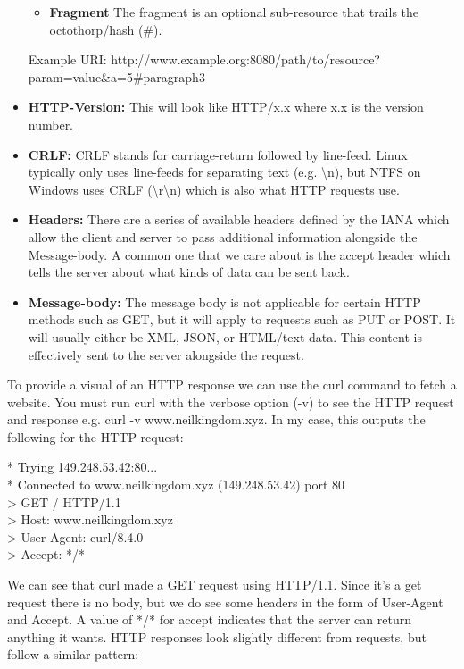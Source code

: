 \documentclass{article}
\begin{document}
\begin{itemize}
{\begin{itemize}
   \item{%
       \textbf{Fragment} The fragment is an optional sub-resource that trails the octothorp/hash (\#).
   }

   \end{itemize}

   Example URI: http://www.example.org:8080/path/to/resource?param=value\&a=5\#paragraph3
}

\item{%
   \textbf{HTTP-Version:} This will look like HTTP/x.x where x.x is the version number.
}

\item{%
   \textbf{CRLF:} CRLF stands for carriage-return followed by line-feed. Linux typically only uses
   line-feeds for separating text (e.g. \textbackslash{}n), but NTFS on Windows uses CRLF
   (\textbackslash{}r\textbackslash{}n) which is also what HTTP requests use.
}

\item{%
   \textbf{Headers:} There are a series of available headers defined by the IANA which allow the
   client and server to pass additional information alongside the Message-body. A common one that we care
   about is the accept header which tells the server about what kinds of data can be sent back.
}

\item{%
   \textbf{Message-body:} The message body is not applicable for certain HTTP methods such as GET,
   but it will apply to requests such as PUT or POST. It will usually either be XML, JSON, or HTML/text data.
   This content is effectively sent to the server alongside the request.
}

\end{itemize}

To provide a visual of an HTTP response we can use the curl command to fetch a website. You must run curl with
the verbose option (-v) to see the HTTP request and response e.g. curl -v www.neilkingdom.xyz. In my case,
this outputs the following for the HTTP request:

*   Trying 149.248.53.42:80...\\
* Connected to www.neilkingdom.xyz (149.248.53.42) port 80\\
> GET / HTTP/1.1\\
> Host: www.neilkingdom.xyz\\
> User-Agent: curl/8.4.0\\
> Accept: */*

We can see that curl made a GET request using HTTP/1.1. Since it's a get request there is no body, but we do
see some headers in the form of User-Agent and Accept. A value of */* for accept indicates that the server can
return anything it wants. HTTP responses look slightly different from requests, but follow a similar pattern:
\end{document}
